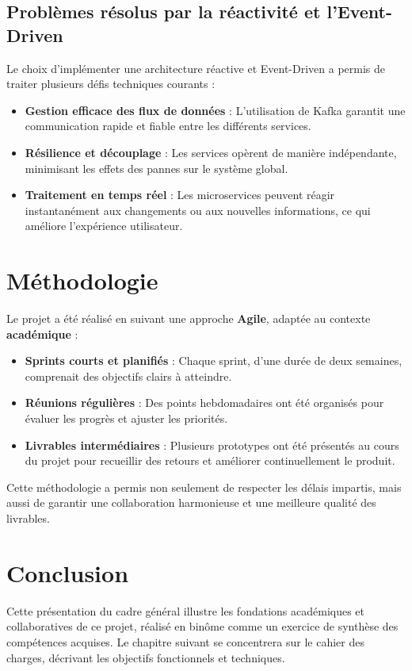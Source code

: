 \documentclass[12pt,a4paper]{report}
\begin{document}
\subsection*{Probl\`emes r\'esolus par la r\'eactivit\'e et l’Event-Driven}
Le choix d’impl\'ementer une architecture r\'eactive et Event-Driven a permis de traiter plusieurs d\'efis techniques courants :
\begin{itemize}
    \item \textbf{Gestion efficace des flux de donn\'ees} : L'utilisation de Kafka garantit une communication rapide et fiable entre les diff\'erents services.
    \item \textbf{R\'esilience et d\'ecouplage} : Les services op\`erent de mani\`ere ind\'ependante, minimisant les effets des pannes sur le syst\`eme global.
    \item \textbf{Traitement en temps r\'eel} : Les microservices peuvent r\'eagir instantan\'ement aux changements ou aux nouvelles informations, ce qui am\'eliore l'exp\'erience utilisateur.
\end{itemize}

\section{M\'ethodologie}
Le projet a \'et\'e r\'ealis\'e en suivant une approche \textbf{Agile}, adapt\'ee au contexte \textbf{acad\'emique} :
\begin{itemize}
    \item \textbf{Sprints courts et planifi\'es} : Chaque sprint, d'une dur\'ee de deux semaines, comprenait des objectifs clairs \`a atteindre.
    \item \textbf{R\'eunions r\'eguli\`eres} : Des points hebdomadaires ont \'et\'e organis\'es pour \'evaluer les progr\`es et ajuster les priorit\'es.
    \item \textbf{Livrables interm\'ediaires} : Plusieurs prototypes ont \'et\'e pr\'esent\'es au cours du projet pour recueillir des retours et am\'eliorer continuellement le produit.
\end{itemize}
Cette m\'ethodologie a permis non seulement de respecter les d\'elais impartis, mais aussi de garantir une collaboration harmonieuse et une meilleure qualit\'e des livrables.

\section*{Conclusion}
Cette pr\'esentation du cadre g\'en\'eral illustre les fondations acad\'emiques et collaboratives de ce projet, r\'ealis\'e en bin\^ome comme un exercice de synth\`ese des comp\'etences acquises. Le chapitre suivant se concentrera sur le cahier des charges, d\'ecrivant les objectifs fonctionnels et techniques.
\end{document}
